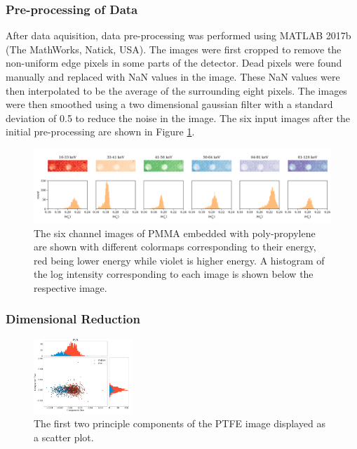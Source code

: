 \documentclass[a4paper,11pt]{article}
\begin{document}
\subsubsection{Pre-processing of Data}

After data aquisition, data pre-processing was performed using MATLAB 2017b (The MathWorks, Natick, USA). The images were first cropped to remove the non-uniform edge pixels in some parts of the detector. Dead pixels were found manually and replaced with NaN values in the image. These NaN values were then interpolated to be the average of the surrounding eight pixels. The images were then smoothed using a two dimensional gaussian filter with a standard deviation of 0.5 to reduce the noise in the image. The six input images after the initial pre-processing are shown in Figure \ref{demonstrating_bins}.

\begin{figure}[htbp]

\includegraphics[width=\textwidth]{figures/poly_figure2.png}

\caption{The six channel images of PMMA embedded with poly-propylene are shown with different colormaps corresponding to their energy, red being lower energy while violet is higher energy. A histogram of the log intensity corresponding to each image is shown below the respective image.}
\label{demonstrating_bins}
\end{figure}

\subsubsection{Dimensional Reduction}

\begin{figure}
  
  \begin{center}
    \includegraphics[width=0.33\textwidth]{figures/PCAnone.png}
  \end{center}
  
  \caption{The first two principle components of the PTFE image displayed as a scatter plot.}
  \label{PCA}
  
\end{figure}
\end{document}
